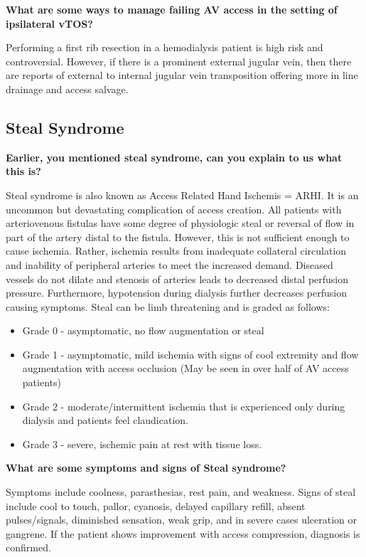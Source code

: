 \documentclass[
]{book}
\begin{document}
\textbf{What are some ways to manage failing AV access in the setting of
ipsilateral vTOS?}

Performing a first rib resection in a hemodialysis patient is high risk
and controversial. However, if there is a prominent external jugular
vein, then there are reports of external to internal jugular vein
transposition offering more in line drainage and access
salvage.\citep{degiovanni2020}

\hypertarget{sec-steal-syndrome}{%
\subsection{Steal Syndrome}\label{sec-steal-syndrome}}

\textbf{Earlier, you mentioned steal syndrome, can you explain to us what this
is?}

Steal syndrome is also known as Access Related Hand Ischemis = ARHI. It
is an uncommon but devastating complication of access creation. All
patients with arteriovenous fistulas have some degree of physiologic
steal or reversal of flow in part of the artery distal to the fistula.
However, this is not sufficient enough to cause ischemia. Rather,
ischemia results from inadequate collateral circulation and inability of
peripheral arteries to meet the increased demand. Diseased vessels do
not dilate and stenosis of arteries leads to decreased distal perfusion
pressure. Furthermore, hypotension during dialysis further decreases
perfusion causing symptoms. Steal can be limb threatening and is graded
as follows:

\begin{itemize}
\item
  Grade 0 - asymptomatic, no flow augmentation or steal
\item
  Grade 1 - asymptomatic, mild ischemia with signs of cool extremity
  and flow augmentation with access occlusion (May be seen in over
  half of AV access patients)\citep{leake2015}
\item
  Grade 2 - moderate/intermittent ischemia that is experienced only
  during dialysis and patients feel claudication.
\item
  Grade 3 - severe, ischemic pain at rest with tissue loss.
\end{itemize}

\textbf{What are some symptoms and signs of Steal syndrome?}

Symptoms include coolness, parasthesias, rest pain, and weakness. Signs
of steal include cool to touch, pallor, cyanosis, delayed capillary
refill, absent pulses/signals, diminished sensation, weak grip, and in
severe cases ulceration or gangrene. If the patient shows improvement
with access compression, diagnosis is confirmed.
\end{document}
